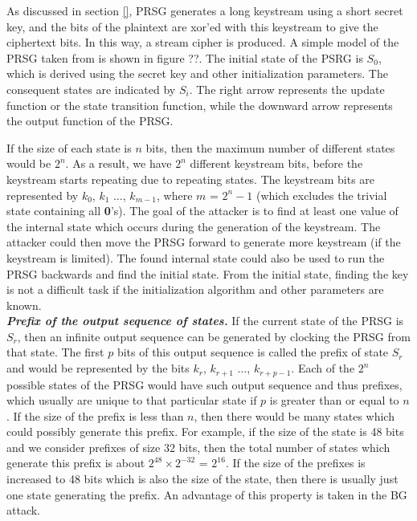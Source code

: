 As discussed in section \ref{}, PRSG generates a long keystream using a short secret key, and the bits of the plaintext are xor'ed with this keystream to give the ciphertext bits. In this way, a stream cipher is produced. A simple model of the PRSG taken from \cite{} is shown in figure ??. The initial state of the PSRG is $S_0$, which is derived using the secret key and other initialization parameters. The consequent states are indicated by $S_i$. The right arrow represents the update function or the state transition function, while the downward arrow represents the output function of the PRSG.

If the size of each state is $n$ bits, then the maximum number of different states would be $2^n$. As a result, we have $2^n$ different keystream bits, before the keystream starts repeating due to repeating states. The keystream bits are represented by $k_0$, $k_1$ $\ldots$, $k_{m-1}$, where $m$ = $2^{n} - 1$ (which excludes the trivial state containing all \textbf{0}'s). The goal of the attacker is to find at least one value of the internal state which occurs during the generation of the keystream. The attacker could then move the PRSG forward to generate more keystream (if the keystream is limited). The found internal state could also be used to run the PRSG backwards and find the initial state. From the initial state, finding the key is not a difficult task if the initialization algorithm and other parameters are known.\\

\textit{\textbf{Prefix of the output sequence of states.}} If the current state of the PRSG is $S_r$, then an infinite output sequence can be generated by clocking the PRSG from that state. The first $p$ bits of this output sequence is called the prefix of state $S_r$ and would be represented by the bits $k_r$, $k_{r+1}$ $\ldots$, $k_{r+p-1}$. Each of the $2^n$ possible states of the PRSG would have such output sequence and thus prefixes, which usually are unique to that particular state if $p$ is greater than or equal to $n$ \cite{}. If the size of the prefix is less than $n$, then there would be many states which could possibly generate this prefix. For example, if the size of the state is 48 bits and we consider prefixes of size 32 bits, then the total number of states which generate this prefix is about $2^{48} \times 2^{-32}$ = $2^{16}$. If the size of the prefixes is increased to 48 bits which is also the size of the state, then there is usually just one state generating the prefix. An advantage of this property is taken in the BG attack.\\

